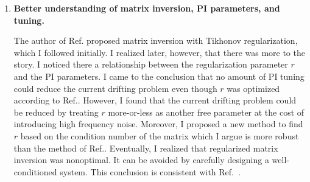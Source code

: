 \begin{enumerate}


\item {\bf Better understanding of matrix inversion, PI parameters, and tuning.} 

The author of Ref.\cite{bea} proposed matrix inversion with Tikhonov regularization, which I followed initially. I realized later, however, that there was more to the story. I noticed there a relationship between the regularization parameter $r$ and the PI parameters. I came to the conclusion that no amount of PI tuning could reduce the current drifting problem even though $r$ was optimized according to Ref.\cite{bea}.  However, I found that the current drifting problem could be reduced by treating $r$ more-or-less as another free parameter at the cost of introducing high frequency noise. Moreover, I proposed a new method to find $r$ based on the condition number of the matrix which I argue is more robust than the method of Ref.\cite{bea}. Eventually, I realized that regularized matrix inversion was nonoptimal. It can be avoided by carefully designing a well-conditioned system. This conclusion is consistent with Ref.~\cite{rawlikpriv}. 


\end{enumerate}
